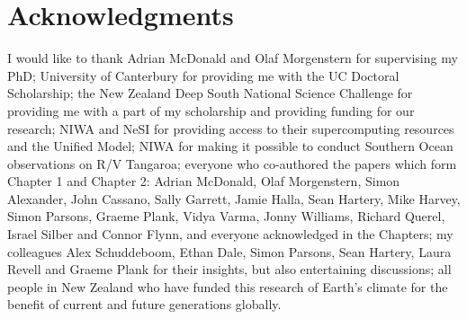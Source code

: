 \section*{Acknowledgments}

I would like to thank
Adrian McDonald and Olaf Morgenstern for supervising my PhD;
University of Canterbury for providing me with the UC Doctoral Scholarship;
the New Zealand Deep South National Science Challenge for providing me with a
part of my scholarship and providing funding for our research;
NIWA and NeSI for providing access to their supercomputing resources and the Unified Model;
NIWA for making it possible to conduct Southern Ocean observations on R/V Tangaroa;
everyone who co-authored the papers which form Chapter 1 and Chapter 2:
Adrian McDonald, Olaf Morgenstern, Simon Alexander, John Cassano,
Sally Garrett, Jamie Halla, Sean Hartery, Mike Harvey, Simon Parsons, Graeme Plank,
Vidya Varma, Jonny Williams, Richard Querel, Israel Silber and Connor Flynn,
and everyone acknowledged in the Chapters;
my colleagues Alex Schuddeboom, Ethan Dale, Simon Parsons, Sean Hartery, Laura Revell and Graeme Plank for their insights, but also entertaining discussions;
all people in New Zealand who have funded this research of Earth's climate
for the benefit of current and future generations globally.

